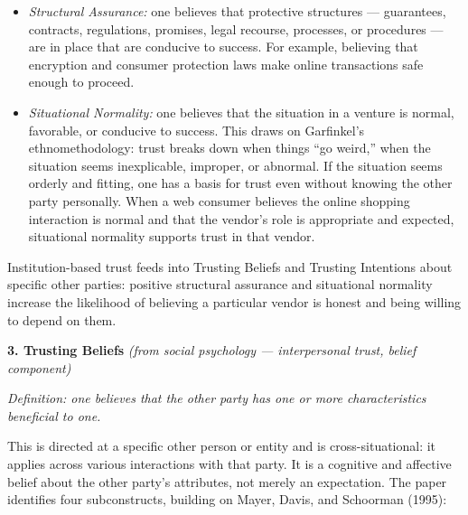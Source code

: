\documentclass[11pt, a4paper]{article}
\begin{document}
\begin{itemize}
  \item \textit{Structural Assurance:} one believes that protective structures --- guarantees, contracts, regulations, promises, legal recourse, processes, or procedures --- are in place that are conducive to success. For example, believing that encryption and consumer protection laws make online transactions safe enough to proceed.
  \item \textit{Situational Normality:} one believes that the situation in a venture is normal, favorable, or conducive to success. This draws on Garfinkel's ethnomethodology: trust breaks down when things ``go weird,'' when the situation seems inexplicable, improper, or abnormal. If the situation seems orderly and fitting, one has a basis for trust even without knowing the other party personally. When a web consumer believes the online shopping interaction is normal and that the vendor's role is appropriate and expected, situational normality supports trust in that vendor.
\end{itemize}

Institution-based trust feeds into Trusting Beliefs and Trusting Intentions about specific other parties: positive structural assurance and situational normality increase the likelihood of believing a particular vendor is honest and being willing to depend on them.

\medskip
\noindent\textbf{3. Trusting Beliefs} \quad \textit{(from social psychology --- interpersonal trust, belief component)}

\medskip
\noindent\textit{Definition: one believes that the other party has one or more characteristics beneficial to one.}

This is directed at a specific other person or entity and is cross-situational: it applies across various interactions with that party. It is a cognitive and affective belief about the other party's attributes, not merely an expectation. The paper identifies four subconstructs, building on Mayer, Davis, and Schoorman (1995):
\end{document}
